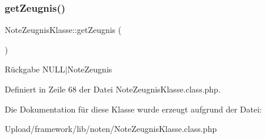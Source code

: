 \subsubsection{\texorpdfstring{get\+Zeugnis()}{getZeugnis()}}
{\footnotesize\ttfamily Note\+Zeugnis\+Klasse\+::get\+Zeugnis (\begin{DoxyParamCaption}{ }\end{DoxyParamCaption})}

\begin{DoxyReturn}{Rückgabe}
N\+U\+L\+L$\vert$\+Note\+Zeugnis 
\end{DoxyReturn}


Definiert in Zeile 68 der Datei Note\+Zeugnis\+Klasse.\+class.\+php.



Die Dokumentation für diese Klasse wurde erzeugt aufgrund der Datei\+:\begin{DoxyCompactItemize}
\item 
Upload/framework/lib/noten/Note\+Zeugnis\+Klasse.\+class.\+php\end{DoxyCompactItemize}
